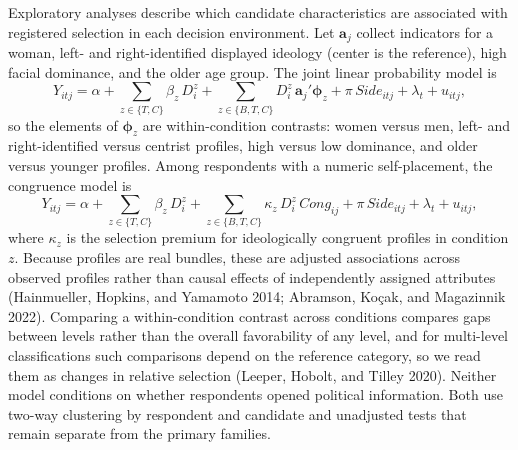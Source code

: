 \documentclass[11pt]{article}\usepackage[]{graphicx}\usepackage[]{xcolor}
\begin{document}
Exploratory analyses describe which candidate characteristics are associated with registered selection in each decision environment. Let $\mathbf{a}_j$ collect indicators for a woman, left- and right-identified displayed ideology (center is the reference), high facial dominance, and the older age group. The joint linear probability model is
\begin{equation}
Y_{itj}=\alpha+\sum_{z\in\{T,C\}}\beta_z\,D^z_i+\sum_{z\in\{B,T,C\}}D^z_i\,\mathbf{a}_j'\boldsymbol{\phi}_z+\pi\,\mathit{Side}_{itj}+\lambda_t+u_{itj},
\label{eq:traits}
\end{equation}
so the elements of $\boldsymbol{\phi}_z$ are within-condition contrasts: women versus men, left- and right-identified versus centrist profiles, high versus low dominance, and older versus younger profiles. Among respondents with a numeric self-placement, the congruence model is
\begin{equation}
Y_{itj}=\alpha+\sum_{z\in\{T,C\}}\beta_z\,D^z_i+\sum_{z\in\{B,T,C\}}\kappa_z\,D^z_i\,\mathit{Cong}_{ij}+\pi\,\mathit{Side}_{itj}+\lambda_t+u_{itj},
\label{eq:congruence}
\end{equation}
where $\kappa_z$ is the selection premium for ideologically congruent profiles in condition $z$. Because profiles are real bundles, these are adjusted associations across observed profiles rather than causal effects of independently assigned attributes (Hainmueller, Hopkins, and Yamamoto 2014; Abramson, Ko\c{c}ak, and Magazinnik 2022). Comparing a within-condition contrast across conditions compares gaps between levels rather than the overall favorability of any level, and for multi-level classifications such comparisons depend on the reference category, so we read them as changes in relative selection (Leeper, Hobolt, and Tilley 2020). Neither model conditions on whether respondents opened political information. Both use two-way clustering by respondent and candidate and unadjusted tests that remain separate from the primary families.
\end{document}
